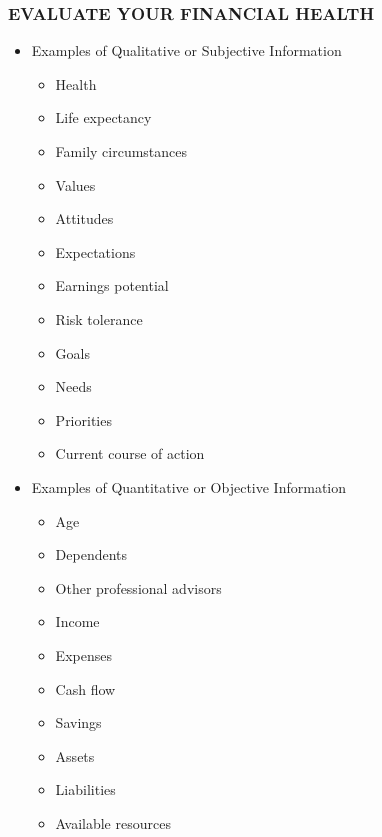 \documentclass[12pt]{article}
\begin{document}
            \subsubsection{EVALUATE YOUR FINANCIAL HEALTH}
                \begin{itemize}
                    \item Examples of Qualitative or Subjective Information
                        \begin{itemize}
                            \item Health
                            \item Life expectancy
                            \item Family circumstances
                            \item Values
                            \item Attitudes
                            \item Expectations
                            \item Earnings potential
                            \item Risk tolerance
                            \item Goals
                            \item Needs
                            \item Priorities
                            \item Current course of action
                        \end{itemize}
                    \item Examples of Quantitative or Objective Information
                        \begin{itemize}
                            \item Age
                            \item Dependents
                            \item Other professional advisors
                            \item Income
                            \item Expenses
                            \item Cash flow
                            \item Savings
                            \item Assets
                            \item Liabilities
                            \item Available resources

\end{itemize}
\end{itemize}
\end{document}
